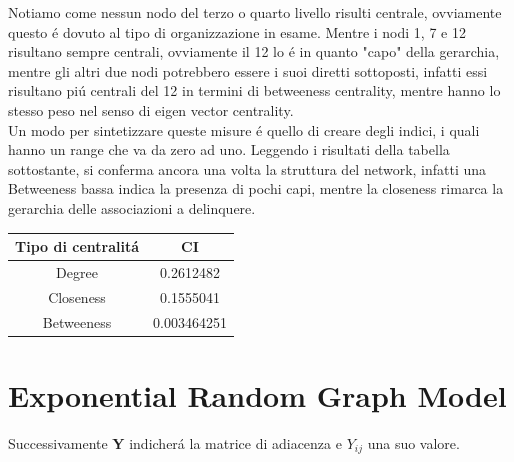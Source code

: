 \documentclass[11pt,a4paper]{report}
\begin{document}
 Notiamo come nessun nodo del terzo o quarto livello risulti centrale, ovviamente questo \'e dovuto al tipo di organizzazione in esame. Mentre i nodi 1, 7 e 12 risultano sempre centrali, ovviamente il 12 lo \'e in quanto "capo" della gerarchia, mentre gli altri due nodi potrebbero essere i suoi diretti sottoposti, infatti essi risultano pi\'u centrali del 12 in termini di betweeness centrality, mentre hanno lo stesso peso nel senso di eigen vector centrality.
 \\
 Un modo per sintetizzare queste misure \'e quello di creare degli indici, i quali hanno un range che va da zero ad uno. Leggendo i risultati della tabella sottostante, si conferma ancora una volta la struttura del network, infatti  una Betweeness bassa indica la presenza di pochi capi, mentre la closeness rimarca la gerarchia delle associazioni a delinquere. \\
 \begin{center}
 \begin{tabular}{c|c}
 	\hline 
 	Tipo di centralit\'a & CI \\ 
 	\hline 
 	Degree &  0.2612482\\ 
 	\hline 
 	Closeness & 0.1555041 \\ 
 	\hline 
 	Betweeness & 0.003464251  \\ 
 	\hline 
 \end{tabular} 
 \end{center}
\chapter{Exponential Random Graph Model}
Successivamente \textbf{Y} indicher\'a la matrice di adiacenza e ${Y_{ij}}$ una suo valore.
\end{document}
